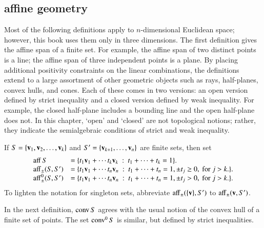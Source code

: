 %





\subsection{affine geometry}




Most of the following definitions apply to $n$-dimensional
Euclidean space; however, this book uses them only in
three dimensions.  The first definition 
gives the affine span of a finite set.  For example,
the affine span of two distinct points is a line;
the affine span of three independent points is a plane.
By placing additional
positivity constraints on the linear combinations, the definitions
extend to a large assortment of other geometric objects
such as rays, half-planes, convex hulls, and cones.  
Each of these comes in two versions: an open version
defined by strict inequality and a closed version defined
by weak inequality.  For example, the closed half-plane
includes a bounding line and the open half-plane does
not.  In this chapter, `open' and `closed' are not topological notions; rather, they
indicate the semialgebraic conditions of strict  and weak inequality.


\begin{definition}[affine]\label{def:aff} 
 If $S = \{{\mathbf v}_1,{\mathbf v}_2,\ldots,{\mathbf v}_k\}$ 
and $S'=\{{\mathbf v}_{k+1},\ldots,{\mathbf v}_n\}$ are  finite sets, then
set
	$$\begin{array}{lll}
      {\operatorname{aff}}\, S &= \{t_1 {\mathbf v}_1 +\cdots t_k {\mathbf v}_k \ :\ 
	t_1 +\cdots+t_k = 1\}.\\
        {\operatorname{aff}}_{\pm} (S,S') &= \{t_1 {\mathbf v}_1 +\cdots t_n {\mathbf v}_n \ :\ 
	t_1 +\cdots+t_n = 1, \pm t_j \ge 0, \text{ for } j>k.\}.\\
        {\operatorname{aff}}^0_{\pm} (S,S') &= \{t_1 {\mathbf v}_1 +\cdots t_n {\mathbf v}_n \ :\ 
	t_1 +\cdots+t_n = 1, \pm t_j > 0, \text{ for } j>k.\}.\\
		\end{array}
        $$
To lighten the notation for singleton sets, abbreviate ${\operatorname{aff}}_\pm(\{{\mathbf v}\},S')$ to
${\operatorname{aff}}_\pm({\mathbf v},S')$.
%
%
%
%
%
\end{definition}


In the next definition, ${\operatorname{conv}}\,S$ agrees with the usual
notion of the convex hull of a finite set of points.
The set ${\operatorname{conv}}^0\,S$ is similar, but defined by strict inequalities.


